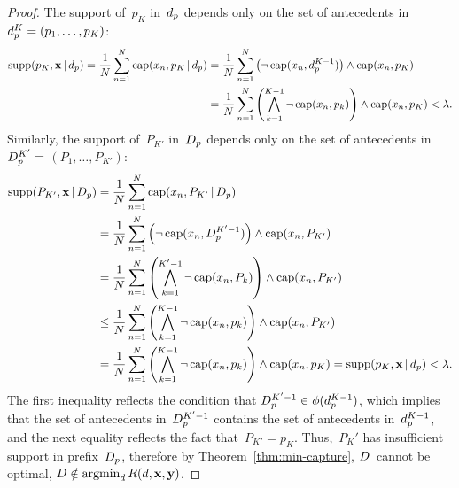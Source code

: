 \begin{arxiv}
\begin{proof}
The support of~$p_K$ in~$d_p$ depends only on the
set of antecedents in ${d_p^{K} = (p_1, \dots, p_{K})}$:
\begin{align}
\textnormal{supp}(p_K, \mathbf{x} \,|\, d_p)
= \frac{1}{N} \sum_{n=1}^N \textnormal{cap}(x_n, p_K \,|\, d_p)
&= \frac{1}{N} \sum_{n=1}^N \left( \neg\, \textnormal{cap}(x_n, d_p^{K-1}) \right)
  \wedge \textnormal{cap}(x_n, p_K) \nonumber \\
&= \frac{1}{N} \sum_{n=1}^N \left( \bigwedge_{k=1}^{K-1} \neg\, \textnormal{cap}(x_n, p_k) \right)
  \wedge \textnormal{cap}(x_n, p_K)
< {\lambda}.
\end{align}
Similarly, the support of~$P_{K'}$ in~$D_p$ depends only on
the set of antecedents in ${D_p^{K'} =}$ ${(P_1, \dots, P_{K'})}$:
\begin{align}
\textnormal{supp}(P_{K'}, \mathbf{x} \,|\, D_p)
&= \frac{1}{N} \sum_{n=1}^N \textnormal{cap}(x_n, P_{K'} \,|\, D_p) \nonumber \\
&= \frac{1}{N} \sum_{n=1}^N \left( \neg\, \textnormal{cap}(x_n, D_p^{K'-1}) \right)
  \wedge \textnormal{cap}(x_n, P_{K'}) \nonumber \\
&= \frac{1}{N} \sum_{n=1}^N \left( \bigwedge_{k=1}^{K'-1} \neg\, \textnormal{cap}(x_n, P_k) \right)
   \wedge \textnormal{cap}(x_n, P_{K'}) \nonumber \\
&\le \frac{1}{N} \sum_{n=1}^N \left( \bigwedge_{k=1}^{K-1} \neg\, \textnormal{cap}(x_n, p_k) \right)
  \wedge \textnormal{cap}(x_n, P_{K'}) \nonumber \\
&= \frac{1}{N} \sum_{n=1}^N \left( \bigwedge_{k=1}^{K-1} \neg\, \textnormal{cap}(x_n, p_k) \right)
  \wedge \textnormal{cap}(x_n, p_{K})
= \textnormal{supp}(p_K, \mathbf{x} \,|\, d_p) < {\lambda}.
\label{ineq:supp}
\end{align}
The first inequality reflects the condition that
${D_p^{K'-1} \in \phi(d_p^{K-1})}$,
which implies that the set of antecedents in~$D_p^{K'-1}$
contains the set of antecedents in~$d_p^{K-1}$,
and the next equality reflects the fact that~${P_{K'} = p_K}$.
%
Thus,~$P_K'$ has insufficient support in prefix~$D_p$,
therefore by Theorem~\ref{thm:min-capture}, ${D}$~cannot be optimal,
\ie ${{D} \notin \operatorname*{argmin}_{{d}} R({d}, \mathbf{x}, \mathbf{y})}$.
\end{proof}


\end{arxiv}
